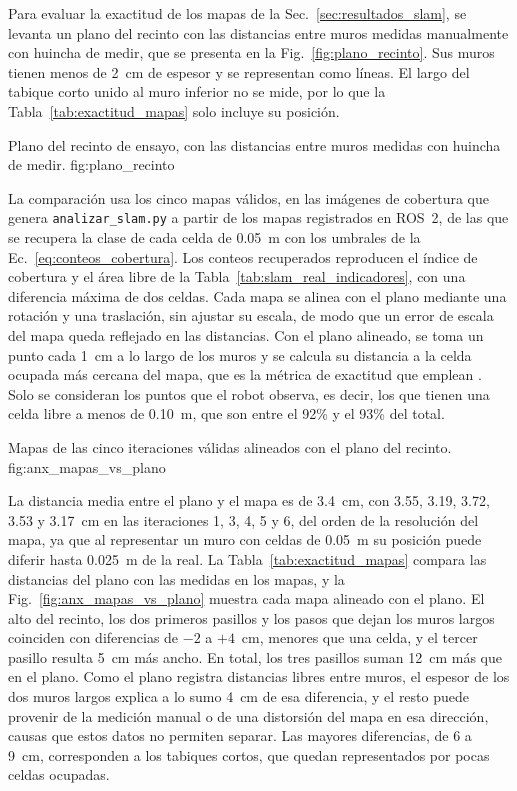 \begin{appendices}
Para evaluar la exactitud de los mapas de la Sec.~\ref{sec:resultados_slam}, se
levanta un plano del recinto con las distancias entre muros medidas
manualmente con huincha de medir, que se presenta en la
Fig.~\ref{fig:plano_recinto}. Sus muros
tienen menos de 2~cm de espesor y se representan como líneas. El largo del
tabique corto unido al muro inferior no se mide, por lo que la
Tabla~\ref{tab:exactitud_mapas} solo incluye su posición.

{Plano del recinto de ensayo, con las distancias entre muros medidas con huincha de medir.}
{fig:plano_recinto}

La comparación usa los cinco mapas válidos, en las imágenes de cobertura que
genera \texttt{analizar\_slam.py} a partir de los mapas registrados en ROS~2,
de las que se recupera la clase de cada celda de 0.05~m con los umbrales de la
Ec.~\eqref{eq:conteos_cobertura}. Los conteos recuperados reproducen el índice
de cobertura y el área libre de la Tabla~\ref{tab:slam_real_indicadores}, con
una diferencia máxima de dos celdas. Cada mapa se alinea con el plano mediante
una rotación y una traslación, sin ajustar su escala, de modo que un error de
escala del mapa queda reflejado en las distancias. Con el plano alineado, se
toma un punto cada 1~cm a lo largo de los muros y se calcula su distancia a la
celda ocupada más cercana del mapa, que es la métrica de exactitud que emplean
\citet{trejos2022slam}. Solo se consideran los puntos que el robot observa, es
decir, los que tienen una celda libre a menos de 0.10~m, que son entre el 92\% y
el 93\% del total.

{Mapas de las cinco iteraciones válidas alineados con el plano del recinto.}
{fig:anx_mapas_vs_plano}

La distancia media entre el plano y el mapa es de 3.4~cm, con 3.55, 3.19, 3.72,
3.53 y 3.17~cm en las iteraciones 1, 3, 4, 5 y 6, del orden de la resolución del
mapa, ya que al
representar un muro con celdas de 0.05~m su posición puede diferir hasta
0.025~m de la real. La Tabla~\ref{tab:exactitud_mapas} compara las distancias
del plano con las medidas en los mapas, y la Fig.~\ref{fig:anx_mapas_vs_plano}
muestra cada mapa alineado con el plano. El alto del recinto, los dos primeros
pasillos y los pasos que dejan los muros largos coinciden con diferencias de
$-2$ a $+4$~cm, menores que una celda, y el tercer pasillo resulta 5~cm más
ancho. En total, los tres pasillos suman 12~cm más que en el plano. Como el
plano registra distancias libres entre muros, el espesor de los dos muros
largos explica a lo sumo 4~cm de esa diferencia, y el resto puede provenir de la
medición manual o de una distorsión del mapa en esa dirección, causas que estos
datos no permiten separar. Las mayores diferencias, de 6 a 9~cm, corresponden a
los tabiques cortos, que quedan representados por pocas celdas ocupadas.


\end{appendices}
